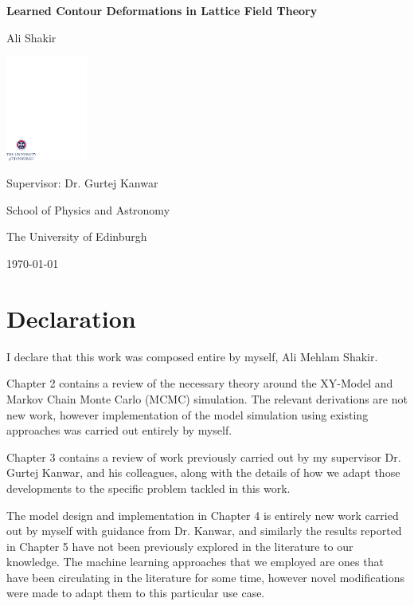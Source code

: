 \documentclass[12pt]{article}
\begin{document}
\begin{titlepage}
	\centering
	\vspace*{2cm}
	{\Huge\bfseries Learned Contour Deformations in Lattice Field Theory\par}
	\vspace{2cm}
	{\Large Ali Shakir\par}
	\vspace{1.5cm}
	\vfill
	\includegraphics[width=0.2\textwidth]{crest.pdf}\par
	\vspace{0.5cm}
	{\large Supervisor: Dr. Gurtej Kanwar\par}
	\vspace{0.5cm}
	{\large School of Physics and Astronomy\par}
	{\large The University of Edinburgh\par}
	\vspace{1cm}
	{\large \today\par}
\end{titlepage}

\section*{Declaration}

I declare that this work was composed entire by myself, Ali Mehlam Shakir.

Chapter 2 contains a review of the necessary theory around the XY-Model and Markov Chain Monte Carlo (MCMC) simulation.
The relevant derivations are not new work, however implementation of the model simulation using existing approaches was
carried out entirely by myself.

Chapter 3 contains a review of work previously carried out by my supervisor Dr. Gurtej Kanwar, and his colleagues, along with
the details of how we adapt those developments to the specific problem tackled in this work.

The model design and implementation in Chapter 4 is entirely new work carried out by myself with guidance from Dr. Kanwar,
and similarly the results reported in Chapter 5 have not been previously explored in the literature to our knowledge. The
machine learning approaches that we employed are ones that have been circulating in the literature for some time, however
novel modifications were made to adapt them to this particular use case.
\end{document}
